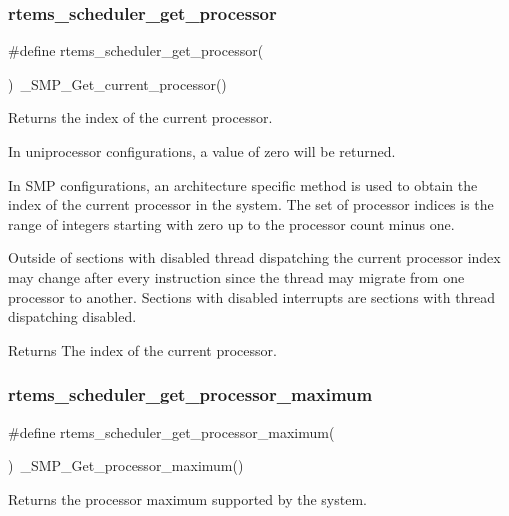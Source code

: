 \subsubsection{\texorpdfstring{rtems\_scheduler\_get\_processor}{rtems\_scheduler\_get\_processor}}
{\footnotesize\ttfamily \#define rtems\+\_\+scheduler\+\_\+get\+\_\+processor(\begin{DoxyParamCaption}{ }\end{DoxyParamCaption})~\+\_\+\+S\+M\+P\+\_\+\+Get\+\_\+current\+\_\+processor()}



Returns the index of the current processor. 

In uniprocessor configurations, a value of zero will be returned.

In S\+MP configurations, an architecture specific method is used to obtain the index of the current processor in the system. The set of processor indices is the range of integers starting with zero up to the processor count minus one.

Outside of sections with disabled thread dispatching the current processor index may change after every instruction since the thread may migrate from one processor to another. Sections with disabled interrupts are sections with thread dispatching disabled.

\begin{DoxyReturn}{Returns}
The index of the current processor. 
\end{DoxyReturn}
\mbox{\label{group__ClassicTasks_ga3bfd90bb42ab219bc15b7b97ffc596b9}} 
\subsubsection{\texorpdfstring{rtems\_scheduler\_get\_processor\_maximum}{rtems\_scheduler\_get\_processor\_maximum}}
{\footnotesize\ttfamily \#define rtems\+\_\+scheduler\+\_\+get\+\_\+processor\+\_\+maximum(\begin{DoxyParamCaption}{ }\end{DoxyParamCaption})~\+\_\+\+S\+M\+P\+\_\+\+Get\+\_\+processor\+\_\+maximum()}



Returns the processor maximum supported by the system. 

